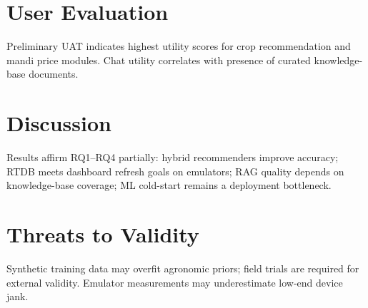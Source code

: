 \section{User Evaluation}
Preliminary UAT indicates highest utility scores for crop recommendation and mandi price modules. Chat utility correlates with presence of curated knowledge-base documents.

\section{Discussion}
Results affirm RQ1--RQ4 partially: hybrid recommenders improve accuracy; RTDB meets dashboard refresh goals on emulators; RAG quality depends on knowledge-base coverage; ML cold-start remains a deployment bottleneck.

\section{Threats to Validity}
Synthetic training data may overfit agronomic priors; field trials are required for external validity. Emulator measurements may underestimate low-end device jank.
